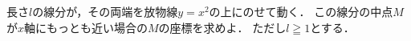 \documentclass[../../main.tex]{subfiles}
\begin{document}
長さ$l$の線分が，その両端を放物線$y=x^2$の上にのせて動く．
この線分の中点$M$が$x$軸にもっとも近い場合の$M$の座標を求めよ．
ただし$l \geqq 1$とする．
\end{document}
